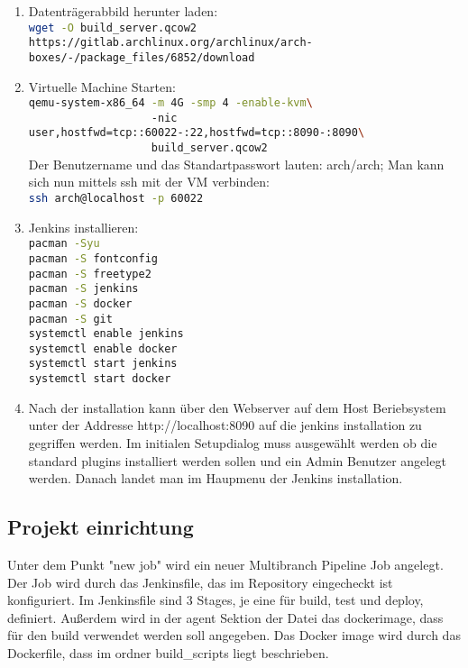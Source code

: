 \begin{enumerate}
    \item Datenträgerabbild herunter laden:\\
        \lstinline[language=sh]!wget -O build_server.qcow2 https://gitlab.archlinux.org/archlinux/arch-boxes/-/package_files/6852/download!
    \item Virtuelle Machine Starten:\\
    \lstinline[language=sh]!qemu-system-x86_64 -m 4G -smp 4 -enable-kvm\! \\
    \lstinline[language=sh]!                   -nic user,hostfwd=tcp::60022-:22,hostfwd=tcp::8090-:8090\ !\\
    \lstinline[language=sh]!                   build_server.qcow2!\\
    Der Benutzername und das Standartpasswort lauten: arch/arch; Man kann sich nun mittels ssh mit der \ac{VM} verbinden:\\
    \lstinline[language=sh]!ssh arch@localhost -p 60022!\\
    \item Jenkins installieren:\\
    \lstinline[language=sh]!pacman -Syu !\\
    \lstinline[language=sh]!pacman -S fontconfig!\\
    \lstinline[language=sh]!pacman -S freetype2!\\
    \lstinline[language=sh]!pacman -S jenkins!\\
    \lstinline[language=sh]!pacman -S docker!\\
    \lstinline[language=sh]!pacman -S git!\\
    \lstinline[language=sh]!systemctl enable jenkins!\\
    \lstinline[language=sh]!systemctl enable docker!\\
    \lstinline[language=sh]!systemctl start jenkins!\\
    \lstinline[language=sh]!systemctl start docker!\\
    \item Nach der installation kann über den Webserver auf dem Host Beriebsystem unter der Addresse http://localhost:8090 auf die jenkins installation zu gegriffen werden. Im initialen Setupdialog muss ausgewählt werden ob die standard plugins installiert werden sollen und ein Admin Benutzer angelegt werden. Danach landet man im Haupmenu der Jenkins installation.
\end{enumerate}

\subsection{Projekt einrichtung}

Unter dem Punkt "new job" wird ein neuer Multibranch Pipeline Job angelegt. Der Job wird durch das Jenkinsfile, das im Repository eingecheckt ist konfiguriert.
Im Jenkinsfile sind 3 Stages, je eine für build, test und deploy, definiert. Außerdem wird in der agent Sektion der Datei das dockerimage, dass für den build verwendet werden soll angegeben. Das Docker image wird durch das Dockerfile, dass im ordner build\_scripts liegt beschrieben.
